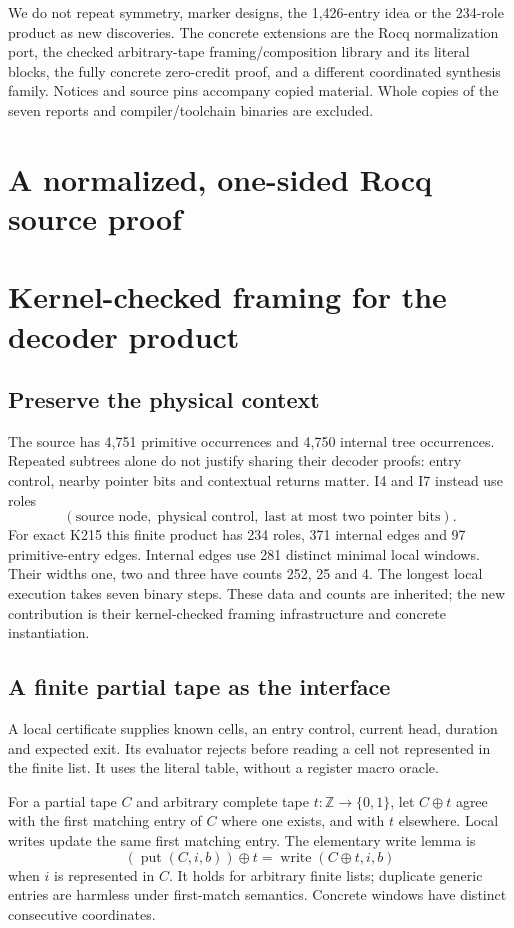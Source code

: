 \documentclass[11pt]{article}
\begin{document}
We do not repeat symmetry, marker designs, the 1,426-entry idea or the 234-role
product as new discoveries. The concrete extensions are the Rocq normalization
port, the checked arbitrary-tape framing/composition library and its literal
blocks, the fully concrete zero-credit proof, and a different coordinated
synthesis family. Notices and source pins accompany copied material. Whole
copies of the seven reports and compiler/toolchain binaries are excluded.

\section{A normalized, one-sided Rocq source proof}


\section{Kernel-checked framing for the decoder product}

\subsection{Preserve the physical context}

The source has 4,751 primitive occurrences and 4,750 internal tree occurrences.
Repeated subtrees alone do not justify sharing their decoder proofs: entry
control, nearby pointer bits and contextual returns matter. I4 and I7 instead
use roles
\[
(\text{source node},\;\text{physical control},\;
 \text{last at most two pointer bits}).
\]
For exact K215 this finite product has 234 roles, 371 internal edges and 97
primitive-entry edges. Internal edges use 281 distinct minimal local windows.
Their widths one, two and three have counts 252, 25 and 4. The longest local
execution takes seven binary steps. These data and counts are inherited;
the new contribution is their kernel-checked framing infrastructure and
concrete instantiation.

\subsection{A finite partial tape as the interface}

A local certificate supplies known cells, an entry control, current head,
duration and expected exit. Its evaluator rejects before reading a cell not
represented in the finite list. It uses the literal table, without a register
macro oracle.

For a partial tape $C$ and arbitrary complete tape $t:\mathbb Z\to\{0,1\}$,
let $C\oplus t$ agree with the first matching entry of $C$ where one exists,
and with $t$ elsewhere. Local writes update the same first matching entry.
The elementary write lemma is
\[
 (\operatorname{put}(C,i,b))\oplus t
 =\operatorname{write}(C\oplus t,i,b)
\]
when $i$ is represented in $C$. It holds for arbitrary finite lists; duplicate
generic entries are harmless under first-match semantics. Concrete windows
have distinct consecutive coordinates.
\end{document}
